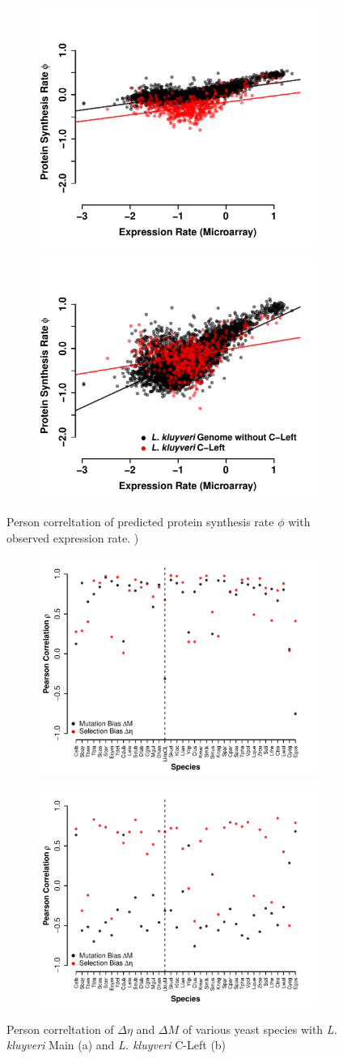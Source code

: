 \documentclass[12pt,draft]{article}
\begin{document}
\begin{figure}[H]
    \centering
    \begin{subfigure}
        \centering
        \includegraphics[width=.4\textwidth]{img/phi_corr_plot_whole_Genome_estim.pdf}
    \end{subfigure}
    \begin{subfigure}
        \centering
        \includegraphics[width=.4\textwidth]{img/phi_corr_plot_split_Genome_estim.pdf}
    \end{subfigure}
    \caption{Person correltation of predicted protein synthesis rate $\phi$ with observed expression rate. )}
    \label{fig:phi_corr_two_cond}
\end{figure}


\begin{figure}[H]
    \centering
    \begin{subfigure}
        \centering
        \includegraphics[width=.4\textwidth]{img/csp_all_species_vs_kuyveri_main.pdf}
    \end{subfigure}
    \begin{subfigure}
        \centering
        \includegraphics[width=.4\textwidth]{img/csp_all_species_vs_kuyveri_cleft.pdf}
    \end{subfigure}
    \caption{Person correltation of $\Delta \eta$ and $\Delta M$ of various yeast species with \textit{L. kluyveri} Main (a) and \textit{L. kluyveri} C-Left (b)}
    \label{fig:csp_cor_all_yeast}
\end{figure}
\end{document}
